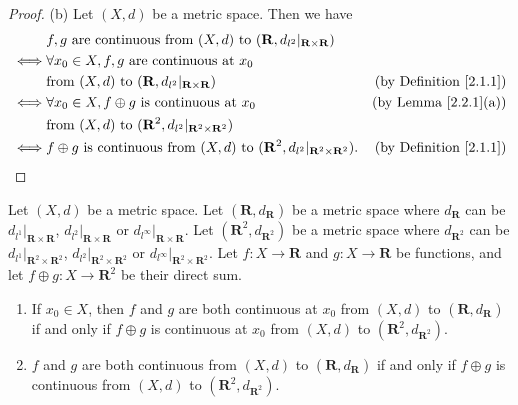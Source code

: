 \begin{proof}{(b)}
    Let \((X, d)\) be a metric space.
    Then we have
    \begin{align*}
             & f, g \text{ are continuous from } (X, d) \text{ to } (\mathbf{R}, d_{l^2}|_{\mathbf{R} \times \mathbf{R}})                                                  \\
        \iff & \forall x_0 \in X, f, g \text{ are continuous at } x_0                                                                                                      \\
             & \text{from } (X, d) \text{ to } (\mathbf{R}, d_{l^2}|_{\mathbf{R} \times \mathbf{R}})                                  & \text{(by Definition \ref{2.1.1})} \\
        \iff & \forall x_0 \in X, f \oplus g \text{ is continuous at } x_0                                                            & \text{(by Lemma \ref{2.2.1}(a))}   \\
             & \text{from } (X, d) \text{ to } (\mathbf{R}^2, d_{l^2}|_{\mathbf{R}^2 \times \mathbf{R}^2})                                                                 \\
        \iff & f \oplus g \text{ is continuous from } (X, d) \text{ to } (\mathbf{R}^2, d_{l^2}|_{\mathbf{R}^2 \times \mathbf{R}^2}). & \text{(by Definition \ref{2.1.1})}
    \end{align*}
\end{proof}

\begin{additional corollary}\label{ac 2.2.1}
Let \((X, d)\) be a metric space.
Let \((\mathbf{R}, d_{\mathbf{R}})\) be a metric space where \(d_{\mathbf{R}}\) can be \(d_{l^1}|_{\mathbf{R} \times \mathbf{R}}\), \(d_{l^2}|_{\mathbf{R} \times \mathbf{R}}\) or \(d_{l^\infty}|_{\mathbf{R} \times \mathbf{R}}\).
Let \((\mathbf{R}^2, d_{\mathbf{R}^2})\) be a metric space where \(d_{\mathbf{R}^2}\) can be \(d_{l^1}|_{\mathbf{R}^2 \times \mathbf{R}^2}\), \(d_{l^2}|_{\mathbf{R}^2 \times \mathbf{R}^2}\) or \(d_{l^\infty}|_{\mathbf{R}^2 \times \mathbf{R}^2}\).
Let \(f : X \to \mathbf{R}\) and \(g : X \to \mathbf{R}\) be functions, and let \(f \oplus g : X \to \mathbf{R}^2\) be their direct sum.
\begin{enumerate}
    \item If \(x_0 \in X\), then \(f\) and \(g\) are both continuous at \(x_0\) from \((X, d)\) to \((\mathbf{R}, d_{\mathbf{R}})\) if and only if \(f \oplus g\) is continuous at \(x_0\) from \((X, d)\) to \((\mathbf{R}^2, d_{\mathbf{R}^2})\).
    \item \(f\) and \(g\) are both continuous from \((X, d)\) to \((\mathbf{R}, d_{\mathbf{R}})\) if and only if \(f \oplus g\) is continuous from \((X, d)\) to \((\mathbf{R}^2, d_{\mathbf{R}^2})\).
\end{enumerate}
\end{additional corollary}

